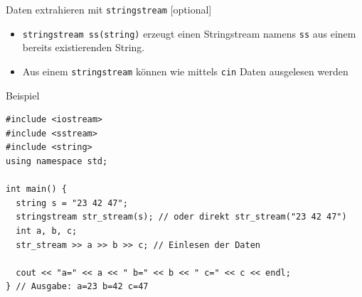 \documentclass[presentation]{beamer}
\begin{document}
\begin{frame}[fragile,label={sec:org525737b}]{Daten extrahieren mit {\color{solarizedYellow}\texttt{stringstream} }[optional]}
 \begin{itemize}
\item {\color{solarizedYellow}\texttt{stringstream ss(string)} }erzeugt einen Stringstream namens {\color{solarizedYellow}\texttt{ss} }aus
einem bereits existierenden String.
\item Aus einem {\color{solarizedYellow}\texttt{stringstream} }können wie mittels {\color{solarizedYellow}\texttt{cin} }Daten ausgelesen
werden
\end{itemize}
\begin{exampleblock}{Beispiel}
\begin{verbatim}
#include <iostream>
#include <sstream>
#include <string>
using namespace std;

int main() {
  string s = "23 42 47";
  stringstream str_stream(s); // oder direkt str_stream("23 42 47")
  int a, b, c;
  str_stream >> a >> b >> c; // Einlesen der Daten

  cout << "a=" << a << " b=" << b << " c=" << c << endl;
} // Ausgabe: a=23 b=42 c=47
\end{verbatim}
\end{exampleblock}
\end{frame}
\end{document}
